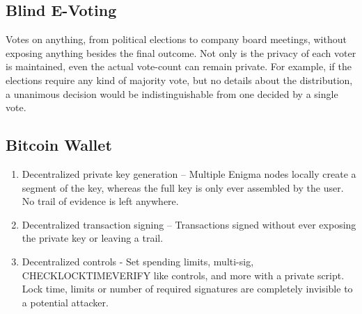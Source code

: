 \documentclass{article} \usepackage{nips13submit_e,times}
\begin{document}
\subsection{Blind E-Voting}

Votes on anything, from political elections to company board meetings, without exposing anything besides the final outcome. Not only is the privacy of each voter is maintained, even the actual vote-count can remain private. For example, if the elections require any kind of majority vote, but no details about the distribution, a unanimous decision would be indistinguishable from one decided by a single vote.

\subsection{Bitcoin Wallet}

\begin{enumerate}
    \item Decentralized private key generation -- Multiple Enigma nodes locally create a segment of the key, whereas the full key is only ever assembled by the user. No trail of evidence is left anywhere.
    
    \item Decentralized transaction signing -- Transactions signed without ever exposing the private key or leaving a trail.
    
    \item Decentralized controls - Set spending limits, multi-sig, CHECKLOCKTIMEVERIFY like controls, and more with a private script. Lock time, limits or number of required signatures are completely invisible to a potential attacker.
    
\end{enumerate}
\end{document}
